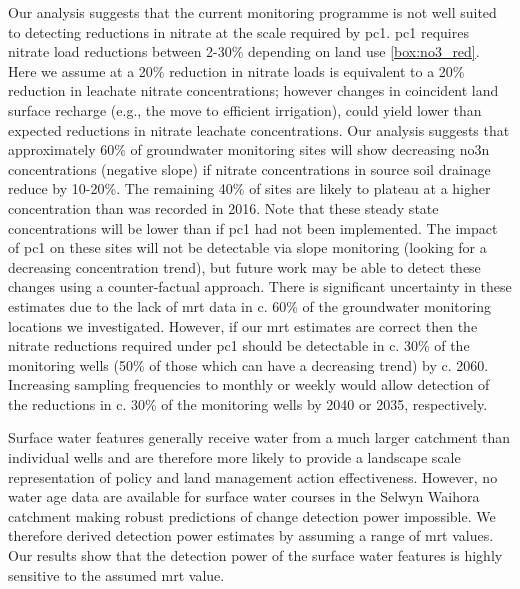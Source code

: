 Our analysis suggests that the current monitoring programme is not well suited to detecting reductions in nitrate at the scale required by \gls{pc1}.
\gls{pc1} requires nitrate load reductions between 2-30\% depending on land use \autoref{box:no3_red}.
Here we assume at a 20\% reduction in nitrate loads is equivalent to a 20\% reduction in leachate nitrate concentrations; however changes in coincident land surface recharge (e.g., the move to efficient irrigation), could yield lower than expected reductions in nitrate leachate concentrations.
Our analysis suggests that approximately 60\% of groundwater monitoring sites will show decreasing \gls{no3n} concentrations (negative slope) if nitrate concentrations in source soil drainage reduce by 10-20\%.
The remaining 40\% of sites are likely to plateau at a higher concentration than was recorded in 2016.
Note that these steady state concentrations will be lower than if \gls{pc1} had not been implemented.
The impact of \gls{pc1} on these  sites will not be detectable via slope monitoring (looking for a decreasing concentration trend), but future work may be able to detect these changes using a counter-factual approach.
There is significant uncertainty in these estimates due to the lack of \gls{mrt} data in c. 60\% of the groundwater monitoring locations we investigated.
However, if our \gls{mrt} estimates are correct then the nitrate reductions required under \gls{pc1} should be detectable in c. 30\% of the monitoring wells (50\% of those which can have a decreasing trend) by c. 2060.
Increasing sampling frequencies to monthly or weekly would allow detection of the reductions in c. 30\% of the monitoring wells by 2040 or 2035, respectively.

Surface water features generally receive water from a much larger catchment than individual wells and are therefore more likely to provide a landscape scale representation of policy and land management action effectiveness. However, no water age data are available for surface water courses in the Selwyn Waihora catchment making robust predictions of change detection power impossible.
We therefore derived detection power estimates by assuming a range of \gls{mrt} values.
Our results show that the detection power of the surface water features is highly sensitive to the assumed \gls{mrt} value.


